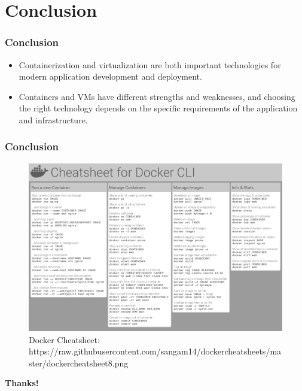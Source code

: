 \documentclass[aspectratio=169]{beamer}
\begin{document}
\section{Conclusion}

\begin{frame}
	\frametitle{Conclusion}
	\begin{itemize}
		\item Containerization and virtualization are both important technologies for modern application development and deployment.
		\item Containers and VMs have different strengths and weaknesses, and choosing the right technology depends on the specific requirements of the application and infrastructure.
	\end{itemize}
\end{frame}

\begin{frame}
	\frametitle{Conclusion}
	\begin{figure}[htbp]
		\centering
		\includegraphics[scale=0.2]{img/docker-cheatsheet.png}
		\caption{Docker Cheatsheet: https://raw.githubusercontent.com/sangam14/dockercheatsheets/master/dockercheatsheet8.png}
	\end{figure}
\end{frame}

\begin{frame}
	\begin{center}
	\fontsize{72pt}{\baselineskip}\selectfont\textbf{Thanks!}
	\end{center}
\end{frame}
\end{document}
